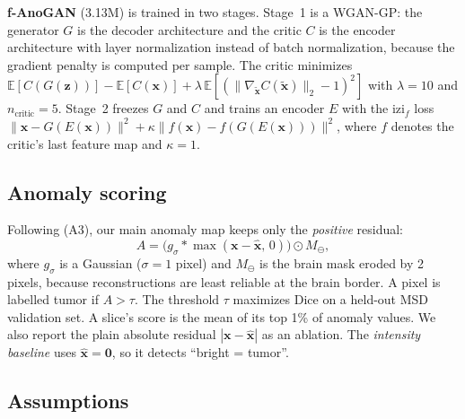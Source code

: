 \documentclass{article}
\begin{document}
\textbf{f-AnoGAN} (3.13M) is trained in two stages. Stage~1 is a WGAN-GP: the
generator $G$ is the decoder architecture and the critic $C$ is the encoder
architecture with layer normalization instead of batch normalization, because
the gradient penalty is computed per sample. The critic minimizes
$\mathbb{E}[C(G(\mathbf{z}))]-\mathbb{E}[C(\mathbf{x})]
+\lambda\,\mathbb{E}[(\|\nabla_{\tilde{\mathbf{x}}}C(\tilde{\mathbf{x}})\|_2-1)^2]$
with $\lambda=10$ and $n_{\text{critic}}=5$. Stage~2 freezes $G$ and $C$ and
trains an encoder $E$ with the izi$_f$ loss
$\|\mathbf{x}-G(E(\mathbf{x}))\|^2+\kappa\|f(\mathbf{x})-f(G(E(\mathbf{x})))\|^2$,
where $f$ denotes the critic's last feature map and $\kappa=1$.

\subsection{Anomaly scoring}

Following (A3), our main anomaly map keeps only the \emph{positive} residual:
\begin{equation}
A = \big(g_{\sigma} * \max(\mathbf{x}-\hat{\mathbf{x}},\,0)\big)\odot M_{\ominus},
\end{equation}
where $g_\sigma$ is a Gaussian ($\sigma=1$ pixel) and $M_\ominus$ is the brain
mask eroded by 2 pixels, because reconstructions are least reliable at the brain
border. A pixel is labelled tumor if $A>\tau$. The threshold $\tau$ maximizes
Dice on a held-out MSD validation set. A slice's score is the mean of its top
1\% of anomaly values. We also report the plain absolute residual
$|\mathbf{x}-\hat{\mathbf{x}}|$ as an ablation. The \emph{intensity baseline}
uses $\hat{\mathbf{x}}=\mathbf{0}$, so it detects ``bright = tumor''.

\subsection{Assumptions}
\label{sec:assumptions}
\end{document}
